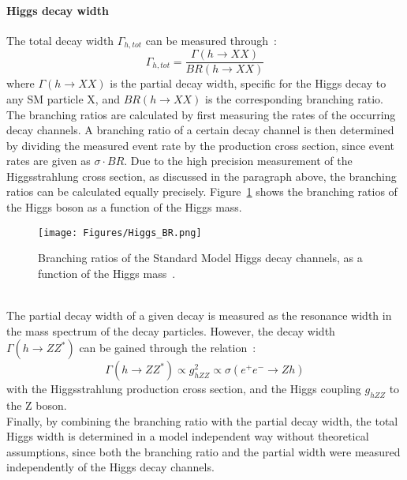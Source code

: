 \paragraph{Higgs decay width}
The total decay width $\Gamma_{h,tot}$ can be measured through~\cite[p. 14]{PhysicsCase}:
\begin{equation}
 \Gamma_{h,tot}=\frac{\Gamma(h\rightarrow XX)}{BR(h\rightarrow XX)}
\end{equation}
where $\Gamma(h\rightarrow XX)$ is the partial decay width, specific for the Higgs decay to any SM particle X, and $BR(h\rightarrow XX)$ is the corresponding branching ratio.\\
The branching ratios are calculated by first measuring the rates of the occurring decay channels.
A branching ratio of a certain decay channel is then determined by dividing the measured event rate by the production cross section, since event rates are given as $\sigma\cdot BR$.
Due to the high precision measurement of the Higgsstrahlung cross section, as discussed in the paragraph above, the branching ratios can be calculated equally precisely.
Figure~\ref{fig:HiggsBR} shows the branching ratios of the Higgs boson as a function of the Higgs mass.
\begin{figure}[h]
\centering
\texttt{[image: Figures/Higgs\_BR.png]}
\caption[Higgs decay branching ratios]{Branching ratios of the Standard Model Higgs decay channels, as a function of the Higgs mass~\cite[p. 15]{TDR2}.}
\label{fig:HiggsBR}
\end{figure}
\\The partial decay width of a given decay is measured as the resonance width in the mass spectrum of the decay particles.
However, the decay width $\Gamma(h\rightarrow ZZ^*)$ can be gained through the relation~\cite[p. 14]{PhysicsCase}:
\begin{equation}
 \Gamma(h\rightarrow ZZ^*)\propto g^2_{hZZ} \propto \sigma(e^+e^-\rightarrow Zh)
\end{equation}
with the Higgsstrahlung production cross section, and the Higgs coupling $g_{hZZ}$ to the Z boson. 
\\Finally, by combining the branching ratio with the partial decay width, the total Higgs width is determined in a model independent way without theoretical assumptions, since both the branching ratio and the partial width were measured independently of the Higgs decay channels.


